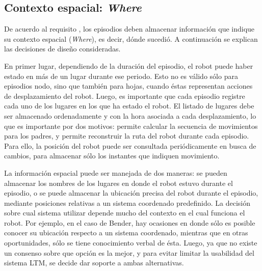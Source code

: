 \subsection{Contexto espacial: \textit{Where}}\label{sec:design_ep_where}

De acuerdo al requisito , los episodios deben almacenar información que indique su contexto espacial (\textit{Where}), es decir, dónde sucedió. A continuación se explican las decisiones de diseño consideradas.

En primer lugar, dependiendo de la duración del episodio, el robot puede haber estado en más de un lugar durante ese periodo. Esto no es válido sólo para episodios nodo, sino que también para hojas, cuando éstas representan acciones de desplazamiento del robot. Luego, es importante que cada episodio registre cada uno de los lugares en los que ha estado el robot. El listado de lugares debe ser almacenado ordenadamente y con la hora asociada a cada desplazamiento, lo que es importante por dos motivos: permite calcular la secuencia de movimientos para los padres, y permite reconstruir la ruta del robot durante cada episodio. Para ello, la posición del robot puede ser consultada periódicamente en busca de cambios, para almacenar sólo los instantes que indiquen movimiento. 

La información espacial puede ser manejada de dos maneras: se pueden almacenar los nombres de los lugares en donde el robot estuvo durante el episodio, o se puede almacenar la ubicación precisa del robot durante el episodio, mediante posiciones relativas a un sistema coordenado predefinido. La decisión sobre cual sistema utilizar depende mucho del contexto en el cual funciona el robot. Por ejemplo, en el caso de Bender, hay ocasiones en donde sólo es posible conocer su ubicación respecto a un sistema coordenado, mientras que en otras oportunidades, sólo se tiene conocimiento verbal de ésta. Luego, ya que no existe un consenso sobre que opción es la mejor, y para evitar limitar la usabilidad del sistema LTM, se decide dar soporte a ambas alternativas.


